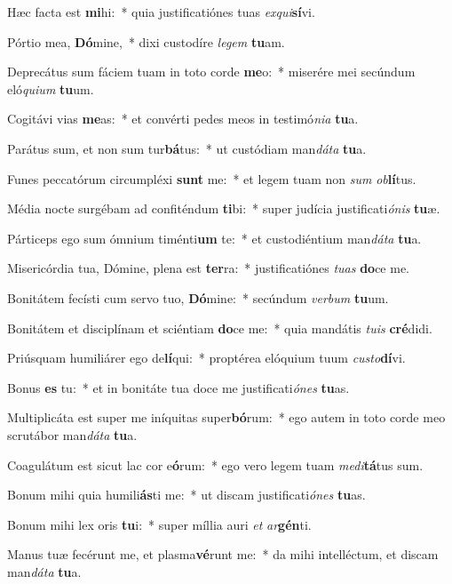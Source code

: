\item Hæc facta est \textbf{mi}hi:~* quia justificatiónes tuas \textit{ex}\textit{qui}\textbf{sí}vi.
\item Pórtio mea, \textbf{Dó}mine,~* dixi custodíre \textit{le}\textit{gem} \textbf{tu}am.
\item Deprecátus sum fáciem tuam in toto corde \textbf{me}o:~* miserére mei secúndum eló\textit{qui}\textit{um} \textbf{tu}um.
\item Cogitávi vias \textbf{me}as:~* et convérti pedes meos in testimó\textit{ni}\textit{a} \textbf{tu}a.
\item Parátus sum, et non sum tur\textbf{bá}tus:~* ut custódiam man\textit{dá}\textit{ta} \textbf{tu}a.
\item Funes peccatórum circumpléxi \textbf{sunt} me:~* et legem tuam non \textit{sum} \textit{ob}\textbf{lí}tus.
\item Média nocte surgébam ad confiténdum \textbf{ti}bi:~* super judícia justificati\textit{ó}\textit{nis} \textbf{tu}æ.
\item Párticeps ego sum ómnium timénti\textbf{um} te:~* et custodiéntium man\textit{dá}\textit{ta} \textbf{tu}a.
\item Misericórdia tua, Dómine, plena est \textbf{ter}ra:~* justificatiónes \textit{tu}\textit{as} \textbf{do}ce me.
\item Bonitátem fecísti cum servo tuo, \textbf{Dó}mine:~* secúndum \textit{ver}\textit{bum} \textbf{tu}um.
\item Bonitátem et disciplínam et sciéntiam \textbf{do}ce me:~* quia mandátis \textit{tu}\textit{is} \textbf{cré}didi.
\item Priúsquam humiliárer ego de\textbf{lí}qui:~* proptérea elóquium tuum \textit{cus}\textit{to}\textbf{dí}vi.
\item Bonus \textbf{es} tu:~* et in bonitáte tua doce me justificati\textit{ó}\textit{nes} \textbf{tu}as.
\item Multiplicáta est super me iníquitas super\textbf{bó}rum:~* ego autem in toto corde meo scrutábor man\textit{dá}\textit{ta} \textbf{tu}a.
\item Coagulátum est sicut lac cor e\textbf{ó}rum:~* ego vero legem tuam \textit{me}\textit{di}\textbf{tá}tus sum.
\item Bonum mihi quia humili\textbf{ás}ti me:~* ut discam justificati\textit{ó}\textit{nes} \textbf{tu}as.
\item Bonum mihi lex oris \textbf{tu}i:~* super míllia auri \textit{et} \textit{ar}\textbf{gén}ti.
\item Manus tuæ fecérunt me, et plasma\textbf{vé}runt me:~* da mihi intelléctum, et discam man\textit{dá}\textit{ta} \textbf{tu}a.
